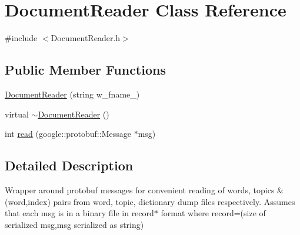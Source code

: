 \hypertarget{class_document_reader}{
\section{DocumentReader Class Reference}
\label{class_document_reader}
}


{\ttfamily \#include $<$DocumentReader.h$>$}

\subsection*{Public Member Functions}
\begin{DoxyCompactItemize}
\item 
\hyperlink{class_document_reader_acd670709e278e782a5a9c79d86ebd086}{DocumentReader} (string w\_\-fname\_\-)
\item 
virtual \hyperlink{class_document_reader_a7f2c184fd2e50aac424543a74373c329}{$\sim$DocumentReader} ()
\item 
int \hyperlink{class_document_reader_a9a3ef697689b237ae93d4d6a1ef73797}{read} (google::protobuf::Message $\ast$msg)
\end{DoxyCompactItemize}


\subsection{Detailed Description}
Wrapper around protobuf messages for convenient reading of words, topics \& (word,index) pairs from word, topic, dictionary dump files respectively. Assumes that each msg is in a binary file in record$\ast$ format where record=(size of serialized msg,msg serialized as string) 

